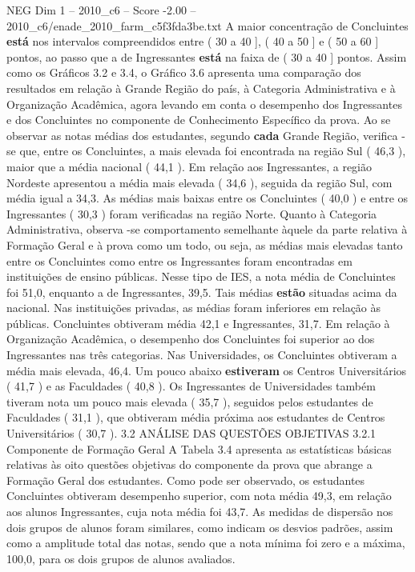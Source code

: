 \begin{textsample}{NEG Dim 1 – 2010\_c6 – Score -2.00 – 2010\_c6/enade\_2010\_farm\_c5f3fda3be.txt}
A maior concentração de Concluintes \textbf{está} nos intervalos compreendidos entre ( 30 a 40 ], ( 40 a 50 ] e ( 50 a 60 ] pontos, ao passo que a de Ingressantes \textbf{está} na faixa de ( 30 a 40 ] pontos.
Assim como os Gráficos 3.2 e 3.4, o Gráfico 3.6 apresenta uma comparação dos resultados em relação à Grande Região do país, à Categoria Administrativa e à Organização Acadêmica, agora levando em conta o desempenho dos Ingressantes e dos Concluintes no componente de Conhecimento Específico da prova.
Ao se observar as notas médias dos estudantes, segundo \textbf{cada} Grande Região, verifica -se que, entre os Concluintes, a mais elevada foi encontrada na região Sul ( 46,3 ), maior que a média nacional ( 44,1 ).
Em relação aos Ingressantes, a região Nordeste apresentou a média mais elevada ( 34,6 ), seguida da região Sul, com média igual a 34,3.
As médias mais baixas entre os Concluintes ( 40,0 ) e entre os Ingressantes ( 30,3 ) foram verificadas na região Norte.
Quanto à Categoria Administrativa, observa -se comportamento semelhante àquele da parte relativa à Formação Geral e à prova como um todo, ou seja, as médias mais elevadas tanto entre os Concluintes como entre os Ingressantes foram encontradas em instituições de ensino públicas.
Nesse tipo de IES, a nota média de Concluintes foi 51,0, enquanto a de Ingressantes, 39,5.
Tais médias \textbf{estão} situadas acima da nacional.
Nas instituições privadas, as médias foram inferiores em relação às públicas.
Concluintes obtiveram média 42,1 e Ingressantes, 31,7.
Em relação à Organização Acadêmica, o desempenho dos Concluintes foi superior ao dos Ingressantes nas três categorias.
Nas Universidades, os Concluintes obtiveram a média mais elevada, 46,4.
Um pouco abaixo \textbf{estiveram} os Centros Universitários ( 41,7 ) e as Faculdades ( 40,8 ).
Os Ingressantes de Universidades também tiveram nota um pouco mais elevada ( 35,7 ), seguidos pelos estudantes de Faculdades ( 31,1 ), que obtiveram média próxima aos estudantes de Centros Universitários ( 30,7 ). 3.2 ANÁLISE DAS QUESTÕES OBJETIVAS 3.2.1 Componente de Formação Geral A Tabela 3.4 apresenta as estatísticas básicas relativas às oito questões objetivas do componente da prova que abrange a Formação Geral dos estudantes.
Como pode ser observado, os estudantes Concluintes obtiveram desempenho superior, com nota média 49,3, em relação aos alunos Ingressantes, cuja nota média foi 43,7.
As medidas de dispersão nos dois grupos de alunos foram similares, como indicam os desvios padrões, assim como a amplitude total das notas, sendo que a nota mínima foi zero e a máxima, 100,0, para os dois grupos de alunos avaliados.

\end{textsample}
